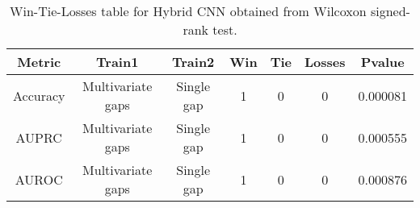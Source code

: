 \begin{table}[H]
\centering
\begin{tabular}{|c|c|c|c|c|c|c|}

\textbf{Metric} &    \textbf{Train1} & \textbf{Train2} &  \textbf{Win} &  \textbf{Tie} &  \textbf{Losses} &  \textbf{Pvalue} \\
\hline

       Accuracy &  Multivariate gaps &      Single gap &             1 &             0 &                0 &         0.000081 \\
\hline
          AUPRC &  Multivariate gaps &      Single gap &             1 &             0 &                0 &         0.000555 \\
\hline
          AUROC &  Multivariate gaps &      Single gap &             1 &             0 &                0 &         0.000876 \\
\hline

\end{tabular}
\caption{Win-Tie-Losses table for Hybrid CNN obtained from Wilcoxon signed-rank test.}
\label{tab:hybrid_cnn_training_data_comparison}
\end{table}
